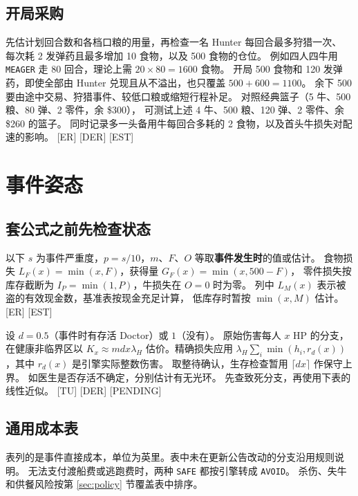 \documentclass[UTF8,11pt,a4paper]{ctexart}
\newcommand{\src}[1]{\textup{\small\textcolor{muted}{[#1]}}}
\newcommand{\api}[1]{\texttt{#1}}
\newcommand{\hp}[1]{K_{#1}}
\newcommand{\fl}[1]{L_F(#1)}
\newcommand{\ml}[1]{L_M(#1)}
\newcommand{\fg}[1]{G_F(#1)}
\begin{document}
\subsection{开局采购}

先估计划回合数和各档口粮的用量，再检查一名 Hunter 每回合最多狩猎一次、
每次耗 2 发弹药且最多增加 10 食物，以及 500 食物的仓位。
例如四人四牛用 \api{MEAGER} 走 80 回合，理论上需 $20\times80=1600$ 食物。
开局 500 食物和 120 发弹药，即使全部由 Hunter 兑现且从不溢出，也只覆盖 $500+600=1100$。
余下 500 要由途中交易、狩猎事件、较低口粮或缩短行程补足。
对照经典篮子（5 牛、500 粮、80 弹、2 零件，余 \$300），
可测试上述 4 牛、500 粮、120 弹、2 零件、余 \$260 的篮子。
同时记录多一头备用牛每回合多耗的 2 食物，以及首头牛损失对配速的影响。 \src{ER} \src{DER} \src{EST}

\clearpage
\section{事件姿态}\label{sec:events}

\subsection{套公式之前先检查状态}

以下 $s$ 为事件严重度，$p=s/10$，$m$、$F$、$O$ 等取\textbf{事件发生时}的值或估计。
食物损失 $\fl{x}=\min(x,F)$，获得量 $\fg{x}=\min(x,500-F)$，
零件损失按库存截断为 $I_P=\min(1,P)$，牛损失在 $O=0$ 时为零。
列中 $\ml{x}$ 表示被盗的有效现金数，基准表按现金充足计算，
低库存时暂按 $\min(x,M)$ 估计。 \src{ER} \src{EST}

设 $d=0.5$（事件时有存活 Doctor）或 $1$（没有）。
原始伤害每人 $x$ HP 的分支，在健康非临界区以
$\hp{x}\approx m d x\lambda_H$ 估价。精确损失应用
$\lambda_H\sum_i\min(h_i,r_d(x))$，其中 $r_d(x)$ 是引擎实际整数伤害。
取整待确认，生存检查暂用 $\lceil dx\rceil$ 作保守上界。
如医生是否存活不确定，分别估计有无光环。
先查致死分支，再使用下表的线性近似。 \src{TU} \src{DER} \src{PENDING}

\subsection{通用成本表}

表列的是事件直接成本，单位为英里。表中未在更新公告改动的分支沿用规则说明。
无法支付渡船费或逃跑费时，两种 \api{SAFE} 都按引擎转成 \api{AVOID}。
杀伤、失牛和供餐风险按第 \ref{sec:policy} 节覆盖表中排序。
\end{document}

